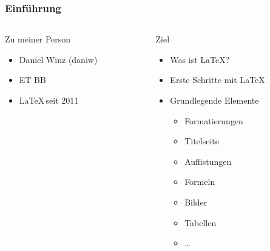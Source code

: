 \begin{frame}
    \frametitle{Einführung}
    \begin{columns}
        \begin{column}{0.50\textwidth}
            \begin{block}{Zu meiner Person}
                \begin{itemize}
                    \item Daniel Winz (daniw)
                    \item ET BB
                    \item \LaTeX \,seit 2011
                \end{itemize}
            \end{block}
        \end{column}
        \pause
        \begin{column}{0.50\textwidth}
            \begin{block}{Ziel}
                \begin{itemize}
                    \item Was ist \LaTeX?
                    \item Erste Schritte mit \LaTeX
                    \item Grundlegende Elemente
                    \begin{itemize}
                        \item Formatierungen
                        \item Titelseite
                        \item Auflistungen
                        \item Formeln
                        \item Bilder
                        \item Tabellen
                        \item \ldots
                    \end{itemize}
                \end{itemize}
            \end{block}
        \end{column}
    \end{columns}
\end{frame}

